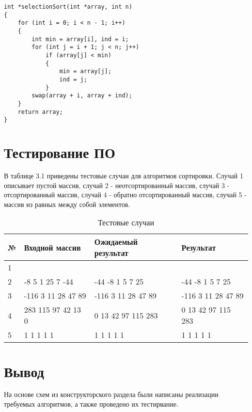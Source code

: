 \begin{lstlisting}[label=selectionSort, caption=Алгоритм сортировки выбором]
int *selectionSort(int *array, int n)
{
    for (int i = 0; i < n - 1; i++)
    {
        int min = array[i], ind = i;
        for (int j = i + 1; j < n; j++)
            if (array[j] < min)
            {
                min = array[j];
                ind = j;
            }
        swap(array + i, array + ind);
    }
    return array;
}
\end{lstlisting}

\section{Тестирование ПО}

В таблице 3.1 приведены тестовые случаи для алгоритмов сортировки. Случай 1 описывает пустой массив, случай 2 - неотсортированный массив, случай 3 - отсортированный массив, случай 4 - обратно отсортированный массив, случай 5 - массив из равных между собой элементов.

\begin{table}[H]
	\begin{center}
		\caption{Тестовые случаи}
		\begin{tabular}{l|l|l|l}
			№ & Входной массив & Ожидаемый результат & Результат\\
			\hline
			1 &  &  & \\ 
			\hline
			2 & -8 5 1 25 7 -44 & -44 -8 1 5 7 25 & -44 -8 1 5 7 25\\
			\hline
			3 & -116 3 11 28 47 89 & -116 3 11 28 47 89 & -116 3 11 28 47 89\\
			\hline
			4 & 283 115 97 42 13 0 & 0 13 42 97 115 283 & 0 13 42 97 115 283\\
			\hline
			5 & 1 1 1 1 1 & 1 1 1 1 1 & 1 1 1 1 1\\
		\end{tabular}
	\end{center}
\end{table}

\section{Вывод}

На основе схем из конструкторского раздела были написаны реализации требуемых алгоритмов, а также проведено их тестирвание.